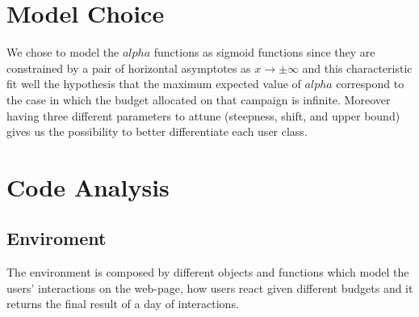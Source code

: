 \section{Model Choice}
\label{sec:env_Motivation}
We chose to model the $alpha$ functions as sigmoid functions since they are constrained by a pair of horizontal asymptotes as $ x\to\pm\infty$  and this characteristic fit well the hypothesis that the maximum expected value of $alpha$ correspond to the case in which the budget allocated on that campaign is infinite. Moreover having three different parameters to attune (steepness, shift, and upper bound) gives us the possibility to better differentiate each user class.

\section{Code Analysis}
\label{sec:env_Code Analysis}
 \subsection{Enviroment}
The environment is composed by different objects and functions which model the users' interactions on the web-page, how users react given different budgets and it returns the final result of a day of interactions.
 
